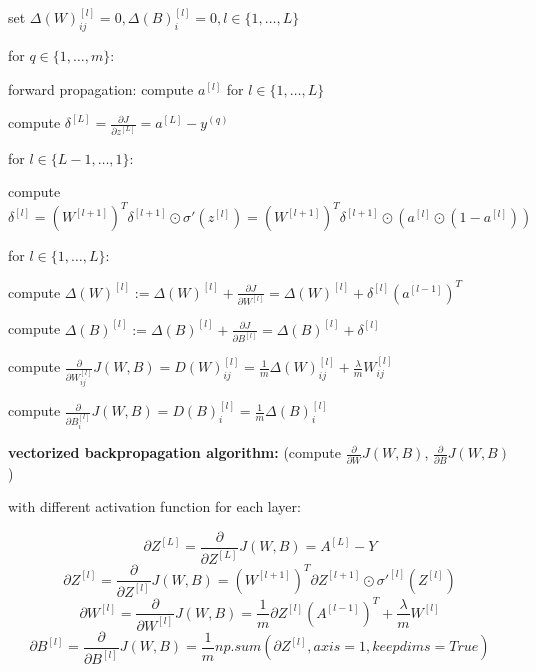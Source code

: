 \documentclass{article}
\begin{document}
\noindent set \(\Delta(W)_{ij}^{[l]} = 0, \Delta(B)_{i}^{[l]} = 0, l \in \{1, \dots, L\}\)

\noindent for \(q \in \{1, \dots, m\}\):

\noindent \hspace{.5cm} forward propagation: compute \(a^{[l]}\) for \(l \in \{1, \dots, L\}\)

\noindent \hspace{.5cm} compute \(\delta^{[L]} = \frac{\partial J}{\partial z^{[L]}} = a^{[L]} - y^{(q)}\)

\noindent \hspace{.5cm} for \(l \in \{L - 1, \dots, 1\}\):

\noindent \hspace{1cm} compute \(\delta^{[l]} = (W^{[l + 1]})^T \delta^{[l + 1]} \odot \sigma'(z^{[l]}) = (W^{[l + 1]})^T \delta^{[l + 1]} \odot (a^{[l]} \odot (1 - a^{[l]}))\)

\noindent \hspace{.5cm} for \(l \in \{1, \dots, L\}\):

\noindent \hspace{1cm} compute \(\Delta(W)^{[l]} := \Delta(W)^{[l]} + \frac{\partial J}{\partial W^{[l]}} = \Delta(W)^{[l]} + \delta^{[l]}(a^{[l - 1]})^T\)

\noindent \hspace{1cm} compute \(\Delta(B)^{[l]} := \Delta(B)^{[l]} + \frac{\partial J}{\partial B^{[l]}} = \Delta(B)^{[l]} + \delta^{[l]}\)

\noindent compute \(\frac{\partial}{\partial W_{ij}^{[l]}} J(W, B) = D(W)_{ij}^{[l]} = \frac{1}{m} \Delta(W)_{ij}^{[l]} + \frac{\lambda}{m} W_{ij}^{[l]}\)

\noindent compute \(\frac{\partial}{\partial B_{i}^{[l]}} J(W, B) = D(B)_{i}^{[l]} = \frac{1}{m} \Delta(B)_{i}^{[l]}\)

\bigskip

\noindent \textbf{vectorized backpropagation algorithm:} (compute \(\frac{\partial}{\partial W} J(W, B)\), \(\frac{\partial}{\partial B} J(W, B)\))

\noindent with different activation function for each layer:

\[\partial Z^{[L]} = \frac{\partial}{\partial Z^{[L]}} J(W, B) = A^{[L]} - Y\]
\[\partial Z^{[l]} = \frac{\partial}{\partial Z^{[l]}} J(W, B) = (W^{[l + 1]})^T \partial Z^{[l + 1]} \odot \sigma'^{[l]}(Z^{[l]})\]
\[\partial W^{[l]} = \frac{\partial}{\partial W^{[l]}} J(W, B) = \frac{1}{m} \partial Z^{[l]} (A^{[l - 1]})^T + \frac{\lambda}{m} W^{[l]}\]
\[\partial B^{[l]} = \frac{\partial}{\partial B^{[l]}} J(W, B) = \frac{1}{m} np.sum(\partial Z^{[l]}, axis=1, keepdims=True)\]
\end{document}
